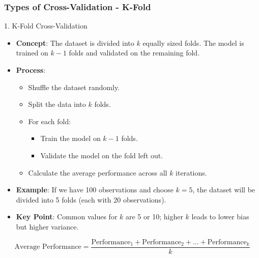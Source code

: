 \documentclass[aspectratio=169]{beamer}
\begin{document}
\begin{frame}[fragile]
    \frametitle{Types of Cross-Validation - K-Fold}
    \begin{block}{1. K-Fold Cross-Validation}
        \begin{itemize}
            \item \textbf{Concept}: The dataset is divided into $k$ equally sized folds. 
            The model is trained on $k-1$ folds and validated on the remaining fold.
            \item \textbf{Process}:
            \begin{itemize}
                \item Shuffle the dataset randomly.
                \item Split the data into $k$ folds.
                \item For each fold:
                \begin{itemize}
                    \item Train the model on $k-1$ folds.
                    \item Validate the model on the fold left out.
                \end{itemize}
                \item Calculate the average performance across all $k$ iterations.
            \end{itemize}
            \item \textbf{Example}: If we have 100 observations and choose $k=5$, 
            the dataset will be divided into 5 folds (each with 20 observations).
            \item \textbf{Key Point}: Common values for $k$ are 5 or 10; higher $k$ leads to lower bias but higher variance.
        \end{itemize}
        \begin{equation}
            \text{Average Performance} = \frac{\text{Performance}_1 + \text{Performance}_2 + \ldots + \text{Performance}_k}{k}
        \end{equation}
    \end{block}
\end{frame}
\end{document}
